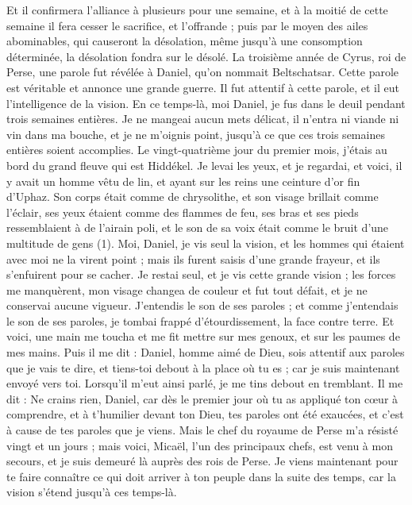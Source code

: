\begin{multicols}{2}
Et il confirmera l'alliance à plusieurs pour une semaine, et à la moitié de cette semaine il fera cesser le sacrifice, et l’offrande ; puis par le moyen des ailes abominables, qui causeront la désolation, même jusqu'à une consomption déterminée, la désolation fondra sur le désolé.
\VerseOne{}La troisième année de Cyrus, roi de Perse, une parole fut révélée à Daniel, qu’on nommait Beltschatsar. Cette parole est véritable et annonce une grande guerre.  Il fut attentif à cette parole, et il eut l’intelligence de la vision.
En ce temps-là, moi Daniel, je fus dans le deuil pendant trois semaines entières.
Je ne mangeai aucun mets délicat, il n'entra ni viande ni vin dans ma bouche, et je ne m'oignis point, jusqu'à ce que ces trois semaines entières soient accomplies.
Le vingt-quatrième jour du premier mois, j'étais au bord du grand fleuve qui est Hiddékel.
Je levai les yeux, et je regardai, et voici, il y avait  un homme vêtu de lin, et ayant sur les reins une ceinture d’or fin d'Uphaz.
Son corps était comme de chrysolithe, et son visage brillait comme l’éclair, ses yeux étaient comme des flammes de feu, ses bras et ses pieds ressemblaient à de l’airain poli, et le son de sa voix était comme le bruit d'une multitude de gens (1).
Moi, Daniel, je vis seul la vision, et les hommes qui étaient avec moi ne la virent point ; mais ils furent saisis d’une grande frayeur, et ils s'enfuirent pour se cacher.
Je restai seul, et je vis cette grande vision ; les forces me manquèrent, mon visage changea de couleur et fut tout défait, et je ne conservai aucune vigueur.
J’entendis  le son de ses paroles ; et comme j’entendais le son de ses paroles,  je tombai frappé d’étourdissement, la face contre terre.
Et voici, une main me toucha et me fit mettre sur mes genoux, et sur les paumes de mes mains.
Puis il me dit : Daniel, homme aimé de Dieu, sois attentif aux paroles que je vais te dire, et tiens-toi debout à la place où tu es ; car je suis maintenant envoyé vers toi. Lorsqu’il m'eut ainsi parlé, je me tins debout en tremblant.
Il me dit : Ne crains rien, Daniel, car dès le premier jour où tu as appliqué ton cœur à comprendre, et à t’humilier devant ton Dieu, tes paroles ont été exaucées, et c’est à cause de tes paroles que je viens.
Mais le chef du royaume de Perse m’a résisté vingt et un jours ; mais voici, Micaël, l'un des principaux chefs, est venu à mon secours, et je suis demeuré là auprès des rois de Perse.
Je viens maintenant pour te faire connaître ce qui doit arriver à ton peuple dans la suite des temps, car la vision s’étend jusqu’à ces temps-là.

\end{multicols}
